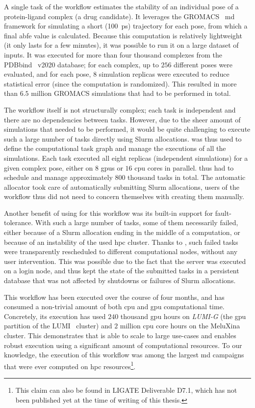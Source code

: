 A single task of the workflow estimates the stability of an individual pose of a protein-ligand
complex (a drug candidate). It leverages the GROMACS~\cite{gromacs}
\gls{md} framework for simulating a short (\SI{100}{\pico\second}) trajectory for
each pose, from which a final \gls{abfe} value is calculated. Because this computation
is relatively lightweight (it only lasts for a few minutes), it was possible to run it on a large
dataset of inputs. It was executed for more than four thousand complexes from the
PDBbind~\cite{pdbbind} v2020 database; for each complex, up to $256$
different poses were evaluated, and for each pose, $8$ simulation replicas were
executed to reduce statistical error (since the computation is randomized). This resulted in more
than $6.5$ million GROMACS simulations that had to be performed in total.

The workflow itself is not structurally complex; each task is independent and there are no
dependencies between tasks. However, due to the sheer amount of simulations that needed to be
performed, it would be quite challenging to execute such a large number of tasks directly using
Slurm allocations. \hyperqueue{} was thus used to define the computational task graph and
manage the executions of all the simulations. Each task executed all eight replicas (independent
simulations) for a given complex pose, either on $8$ \glspl{gpu} or
$16$ \gls{cpu} cores in parallel. \hyperqueue{} thus had
to schedule and manage approximately $800$ thousand tasks in total. The automatic
allocator took care of automatically submitting Slurm allocations, users of the workflow thus did
not need to concern themselves with creating them manually.

Another benefit of using \hyperqueue{} for this workflow was its built-in support for
fault-tolerance. With such a large number of tasks, some of them necessarily failed, either because
of a Slurm allocation ending in the middle of a computation, or because of an instability of the
used \gls{hpc} cluster. Thanks to \hyperqueue{}, such failed tasks were
transparently rescheduled to different computational nodes, without any user intervention. This was
possible due to the fact that the \hq{} server was executed on a login node, and
thus kept the state of the submitted tasks in a persistent database that was not affected by
shutdowns or failures of Slurm allocations.

This workflow has been executed over the course of four months, and has consumed a non-trivial
amount of both \gls{cpu} and \gls{gpu} computational time. Concretely,
its execution has used $240$ thousand \gls{gpu} hours on
\emph{LUMI-G}
(the \gls{gpu} partition of the LUMI~\cite{lumi} cluster) and $2$ million \gls{cpu} core hours on
the MeluXina~\cite{meluxina} cluster. This demonstrates that \hyperqueue{} is
able to scale to large use-cases and enables robust execution using a significant amount of
computational resources. To our knowledge, the execution of this workflow was among the largest
\gls{md} campaigns that were ever computed on \gls{hpc}
resources\footnote{This claim can also be found in LIGATE Deliverable D7.1, which has not been published yet at the time of writing of this thesis.}.

